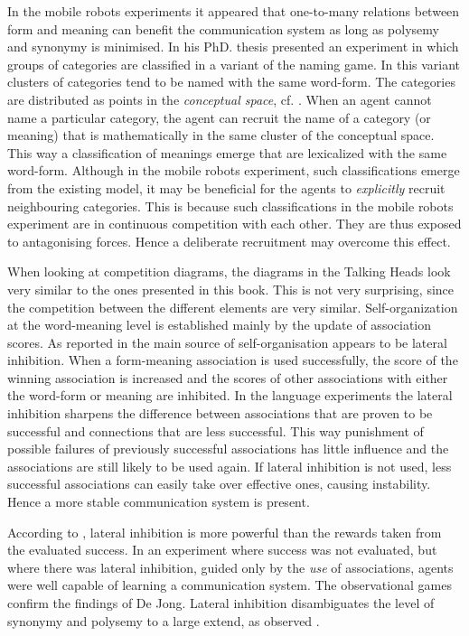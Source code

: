 In the mobile robots experiments it appeared that one-to-many relations between form and meaning can benefit the communication system as long as polysemy and synonymy is minimised. In his PhD. thesis \citet{kaplan:2000} presented an experiment in which groups of categories are classified in a variant of the naming game. In this variant clusters of categories tend to be named with the same word-form. The categories are distributed as points in the {\em conceptual space}, cf. \citep{gardenfors:1996}. When an agent cannot name a particular category, the agent can recruit the name of a category (or meaning) that is mathematically in the same cluster of the conceptual space. This way a classification of meanings emerge that are lexicalized with the same word-form. Although in the mobile robots experiment, such classifications emerge from the existing model, it may be beneficial for the agents to {\em explicitly} recruit neighbouring categories. This is because such classifications in the mobile robots experiment are in continuous competition with each other. They are thus exposed to antagonising forces. Hence a deliberate recruitment may overcome this effect.



When looking at competition diagrams, the diagrams in the Talking Heads look very similar to the ones presented in this book. This is not very surprising, since the competition between the different elements are very similar. Self-organization at the word-meaning level is established mainly by the update of association scores. As reported in \citep{steels:2000,dejong:2000,kaplan:2000} the main source of self-organisation appears to be lateral inhibition. When a form-meaning association is used successfully, the score of the winning association is increased and the scores of other associations with either the word-form or meaning are inhibited. In the language experiments the lateral inhibition sharpens the difference between associations that are proven to be successful and connections that are less successful. This way punishment of possible failures of previously successful associations has little influence and the associations are still likely to be used again. If lateral inhibition is not used, less successful associations can easily take over effective ones, causing instability. Hence a more stable communication system is present.

According to \citet{dejong:2000}, lateral inhibition is more powerful than the rewards taken from the evaluated success. In an experiment where success was not evaluated, but where there was lateral inhibition, guided only by the {\em use} of associations, agents were well capable of learning a communication system. The observational games confirm the findings of De Jong. Lateral inhibition disambiguates the level of synonymy and polysemy to a large extend, as observed .

